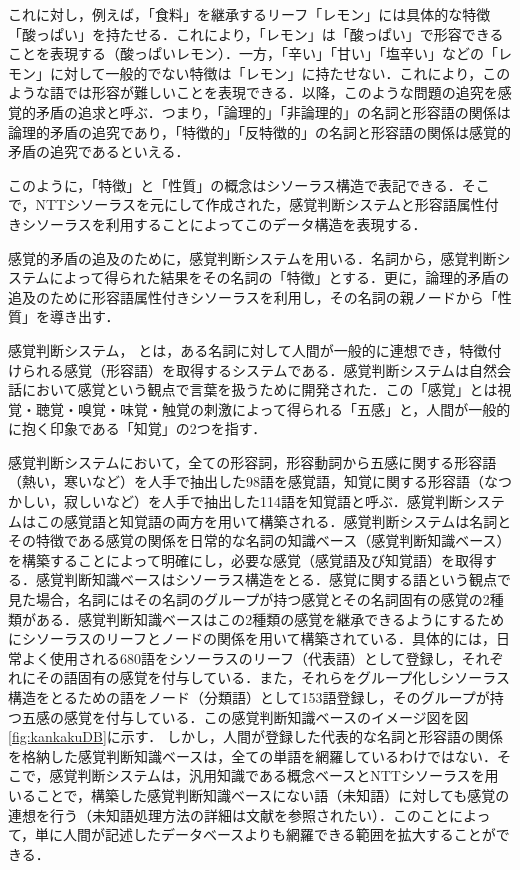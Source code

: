 \documentclass[japanese]{jnlp_1.4}
\begin{document}
これに対し，例えば，「食料」を継承するリーフ「レモン」には具体的な特徴「酸っぱい」を持たせる．これにより，「レモン」は「酸っぱい」で形容できることを表現する（酸っぱいレモン）．一方，「辛い」「甘い」「塩辛い」などの「レモン」に対して一般的でない特徴は「レモン」に持たせない．これにより，このような語では形容が難しいことを表現できる．以降，このような問題の追究を感覚的矛盾の追求と呼ぶ．つまり，「論理的」「非論理的」の名詞と形容語の関係は論理的矛盾の追究であり，「特徴的」「反特徴的」の名詞と形容語の関係は感覚的矛盾の追究であるといえる．

このように，「特徴」と「性質」の概念はシソーラス構造で表記できる．そこで，NTTシソーラスを元にして作成された，感覚判断システム\cite{Watabe2004}と形容語属性付きシソーラスを利用することによってこのデータ構造を表現する．

感覚的矛盾の追及のために，感覚判断システムを用いる．名詞から，感覚判断システムによって得られた結果をその名詞の「特徴」とする．更に，論理的矛盾の追及のために形容語属性付きシソーラスを利用し，その名詞の親ノードから「性質」を導き出す．

感覚判断システム\cite{Watabe2004}， \cite{Kometani2003}とは，ある名詞に対して人間が一般的に連想でき，特徴付けられる感覚（形容語）を取得するシステムである．感覚判断システムは自然会話において感覚という観点で言葉を扱うために開発された．この「感覚」とは視覚・聴覚・嗅覚・味覚・触覚の刺激によって得られる「五感」と，人間が一般的に抱く印象である「知覚」の2つを指す．

感覚判断システムにおいて，全ての形容詞，形容動詞から五感に関する形容語（熱い，寒いなど）を人手で抽出した98語を感覚語，知覚に関する形容語（なつかしい，寂しいなど）を人手で抽出した114語を知覚語と呼ぶ．感覚判断システムはこの感覚語と知覚語の両方を用いて構築される．感覚判断システムは名詞とその特徴である感覚の関係を日常的な名詞の知識ベース（感覚判断知識ベース）を構築することによって明確にし，必要な感覚（感覚語及び知覚語）を取得する．感覚判断知識ベースはシソーラス構造をとる．感覚に関する語という観点で見た場合，名詞にはその名詞のグループが持つ感覚とその名詞固有の感覚の2種類がある．感覚判断知識ベースはこの2種類の感覚を継承できるようにするためにシソーラスのリーフとノードの関係を用いて構築されている．具体的には，日常よく使用される680語をシソーラスのリーフ（代表語）として登録し，それぞれにその語固有の感覚を付与している．また，それらをグループ化しシソーラス構造をとるための語をノード（分類語）として153語登録し，そのグループが持つ五感の感覚を付与している．この感覚判断知識ベースのイメージ図を図\ref{fig:kankakuDB}に示す．
しかし，人間が登録した代表的な名詞と形容語の関係を格納した感覚判断知識ベースは，全ての単語を網羅しているわけではない．そこで，感覚判断システムは，汎用知識である概念ベース\cite{Hirose2002}とNTTシソーラス\cite{NttThesaurus1997}を用いることで，構築した感覚判断知識ベースにない語（未知語）に対しても感覚の連想を行う（未知語処理方法の詳細は文献\cite{Tsuchiya2002}を参照されたい）．このことによって，単に人間が記述したデータベースよりも網羅できる範囲を拡大することができる． 
\end{document}
